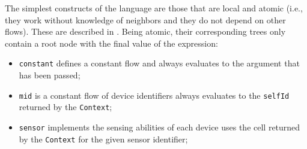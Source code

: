 The simplest constructs of the language are those that are local and atomic (i.e., they work without knowledge of neighbors and they do not depend on other flows).
%
These are described in .
%
Being atomic, their corresponding trees only contain a root node with the final value of the expression:
\begin{itemize}
    \item \texttt{constant} defines a constant flow and always evaluates to the argument that has been passed;
    \item \texttt{mid} is a constant flow of device identifiers always evaluates to the \texttt{selfId} returned by the \texttt{Context};
    \item \texttt{sensor} implements the sensing abilities of each device uses the cell returned by the \texttt{Context} for the given sensor identifier;
\end{itemize}
%
